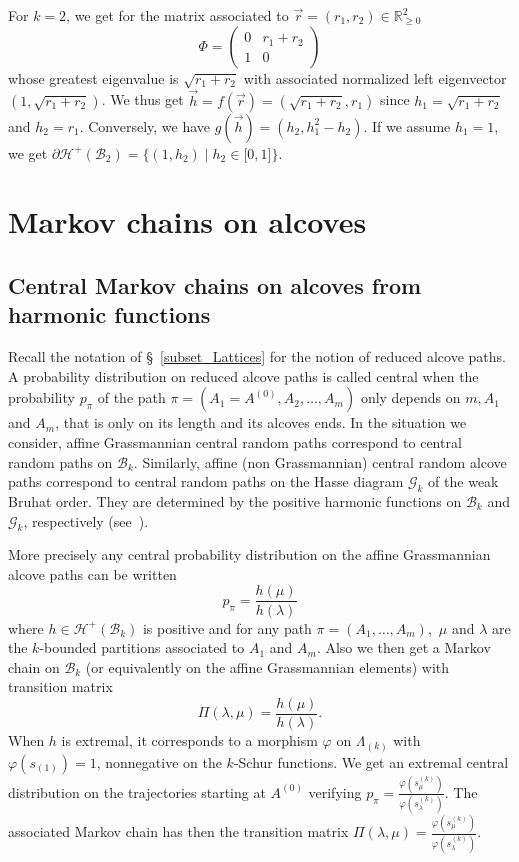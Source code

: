 \documentclass[ALCO,ThmDefs,Unicode,epreuves]{cedram}
\begin{document}
\begin{exam}
\label{Ex_k=2}For $k=2$, we get for the matrix associated to $\vec{r}%
=(r_{1},r_{2})\in\mathbb{R}_{\geq0}^{2}$%
\[
\Phi=\left(
\begin{matrix}
0 & r_{1}+r_{2}\\
1 & 0
\end{matrix}
\right)
\]
whose greatest eigenvalue is $\sqrt{r_{1}+r_{2}}$ with associated normalized
left eigenvector $(1,\sqrt{r_{1}+r_{2}})$. We thus get $\vec{h}=f(\vec
{r})=(\sqrt{r_{1}+r_{2}},r_{1})$ since $h_{1}=\sqrt{r_{1}+r_{2}}$ and
$h_{2}=r_{1}$. Conversely, we have $g(\vec{h})=(h_{2},h_{1}^{2}-h_{2})$. If we
assume $h_{1}=1$, we get $\partial\mathcal{H}^{+}(\mathcal{B}_{2}%
)=\{(1,h_{2})\mid h_{2}\in\lbrack0,1]\}.$
\end{exam}

\section{Markov chains on alcoves}\label{section6}

\subsection{Central Markov chains on alcoves from harmonic functions}

\label{definitionCentral_Markov}

Recall the notation of \S~\ref{subset_Lattices} for the notion of reduced
alcove paths. A probability distribution on reduced alcove paths is called
central when the probability $p_{\pi}$ of the path $\pi=(A_{1}=A^{(0)}%
,A_{2},\ldots,A_{m})$ only depends on $m,A_{1}$ and $A_{m}$, that is only on
its length and its alcoves ends. In the situation we consider, affine
Grassmannian central random paths correspond to central random paths on
$\mathcal{B}_{k}$. Similarly, affine (non Grassmannian) central random alcove
paths correspond to central random paths on the Hasse diagram $\mathcal{G}%
_{k}$ of the weak Bruhat order. They are determined by the positive harmonic
functions on $\mathcal{B}_{k}$ and $\mathcal{G}_{k}$,
respectively (see~\cite{Ker}).

More precisely any central probability distribution on the affine Grassmannian
alcove paths can be written
\[
p_{\pi}=\frac{h(\mu)}{h(\lambda)}%
\]
where $h\in\mathcal{H}^{+}(\mathcal{B}_{k})$ is positive and for any path
$\pi=(A_{1},\ldots,A_{m}),$ $\mu$ and $\lambda$ are the $k$-bounded partitions
associated to $A_{1}$ and $A_{m}$. Also we then get a Markov chain on
$\mathcal{B}_{k}$ (or equivalently on the affine Grassmannian elements) with
transition matrix
\[
\Pi(\lambda,\mu)=\frac{h(\mu)}{h(\lambda)}.
\]
When $h$ is extremal, it corresponds to a morphism $\varphi$ on $\Lambda
_{(k)}$ with $\varphi(s_{(1)})=1$, nonnegative on the $k$-Schur functions. We
get an extremal central distribution on the trajectories starting at $A^{(0)}$
verifying $p_{\pi}=\frac{\varphi(s_{\mu}^{(k)})}{\varphi(s_{\lambda}^{(k)})}%
$. The associated Markov chain has then the transition matrix $\Pi
(\lambda,\mu)=\frac{\varphi(s_{\mu}^{(k)})}{\varphi(s_{\lambda}^{(k)})}$.
\end{document}
